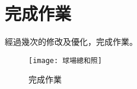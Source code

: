 \chapter{完成作業}
經過幾次的修改及優化，完成作業。
\begin{figure}[hbt!]
\begin{center}
\texttt{[image: 球場總和照]}
\caption{\Large 完成作業}
\label{完成作業}
\end{center}
\end{figure}